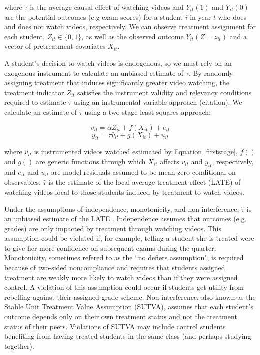 \documentclass[12pt]{article}
\begin{document}
where $\tau$ is the average causal effect of watching videos and $Y_{it}(1)$ and $Y_{it}(0)$ are the potential outcomes (e.g exam scores) for a student $i$ in year $t$ who does and does not watch videos, respectively. We can observe treatment assignment for each student, $Z_{it} \in \{0,1\}$, as well as the observed outcome $Y_{it}(Z=z_{it})$ and a vector of pretreatment covariates $X_{it}$.

A student's decision to watch videos is endogenous, so we must rely on an exogenous instrument to calculate an unbiased estimate of $\tau$. By randomly assigning treatment that induces significantly greater video watching, the treatment indicator $Z_{it}$ satisfies the instrument validity and relevancy conditions required to estimate $\tau$ using an instrumental variable approach (citation). We calculate an estimate of $\tau$ using a two-stage least squares approach:

\begin{equation} \label{firststage}
	v_{it} = \alpha Z_{it} + f(X_{it}) + e_{it}
\end{equation}
\begin{equation} \label{secondstage}
	y_{it} = \tau \hat{v}_{it} + g(X_{it}) + u_{it}
\end{equation}

where $\hat{v}_{it}$ is instrumented videos watched estimated by Equation \ref{firststage}, $f()$ and $g()$ are generic functions through which $X_{it}$ affects $v_{it}$ and $y_{it}$, respectively, and $e_{it}$ and $u_{it}$ are model residuals assumed to be mean-zero conditional on observables. $\hat{\tau}$ is the estimate of the local average treatment effect (LATE) of watching videos local to those students induced by treatment to watch videos.

Under the assumptions of independence, monotonicity, and non-interference, $\hat{\tau}$ is an unbiased estimate of the LATE \parencite{ai1995}. Independence assumes that outcomes (e.g. grades) are only impacted by treatment through watching videos. This assumption could be violated if, for example, telling a student she is treated were to give her more confidence on subsequent exams during the quarter. Monotonicity, sometimes refered to as the ``no defiers assumption", is required because of two-sided noncompliance and requires that students assigned treatment are weakly more likely to watch videos than if they were assigned control. A violation of this assumption could occur if students get utility from rebelling against their assigned grade scheme. Non-interference, also known as the Stable Unit Treatment Value Assumption (SUTVA), assumes that each student's outcome depends only on their own treatment status and not the treatment status of their peers. Violations of SUTVA may include control students benefiting from having treated students in the same class (and perhaps studying together).
\end{document}
